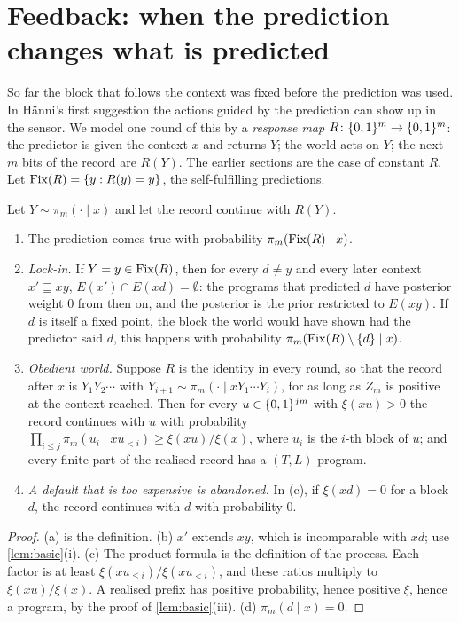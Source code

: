 \section{Feedback: when the prediction changes what is predicted}\label{sec:feedback}

So far the block that follows the context was fixed before the prediction was used. In H\"anni's first
suggestion the actions guided by the prediction can show up in the sensor. We model one round of this by a
\emph{response map} $R\colon\{0,1\}^m\to\{0,1\}^m$: the predictor is given the context $x$ and returns $Y$; the world
acts on $Y$; the next $m$ bits of the record are $R(Y)$. The earlier sections are the case of constant $R$.
Let $\mathrm{Fix}(R)=\{y:R(y)=y\}$, the self-fulfilling predictions.

\begin{theorem}\label{thm:feedback}
Let $Y\sim\pi_m(\cdot\mid x)$ and let the record continue with $R(Y)$.
\begin{enumerate}[label=(\alph*),leftmargin=2em,itemsep=2pt,topsep=2pt]
\item The prediction comes true with probability $\pi_m(\mathrm{Fix}(R)\mid x)$.
\item \emph{Lock-in.} If $Y=y\in\mathrm{Fix}(R)$, then for every $d\ne y$ and every later context $x'\sqsupseteq xy$,
$E(x')\cap E(xd)=\emptyset$: the programs that predicted $d$ have posterior weight $0$ from then on, and the
posterior is the prior restricted to $E(xy)$. If $d$ is itself a fixed point, the block the world would have
shown had the predictor said $d$, this happens with probability $\pi_m(\mathrm{Fix}(R)\setminus\{d\}\mid x)$.
\item \emph{Obedient world.} Suppose $R$ is the identity in every round, so that the record after $x$ is
$Y_1Y_2\cdots$ with $Y_{i+1}\sim\pi_m(\cdot\mid xY_1\cdots Y_i)$, for as long as $Z_m$ is positive at the
context reached. Then for every $u\in\{0,1\}^{jm}$ with $\xi(xu)>0$ the record
continues with $u$ with probability $\prod_{i\le j}\pi_m(u_i\mid xu_{<i})\ge\xi(xu)/\xi(x)$, where $u_i$ is the
$i$-th block of $u$; and every finite part of the realised record has a $(T,L)$-program.
\item \emph{A default that is too expensive is abandoned.} In (c), if $\xi(xd)=0$ for a block $d$, the record
continues with $d$ with probability $0$.
\end{enumerate}
\end{theorem}
\begin{proof}
(a) is the definition. (b) $x'$ extends $xy$, which is incomparable with $xd$; use \cref{lem:basic}(i). (c) The
product formula is the definition of the process. Each factor is at least $\xi(xu_{\le i})/\xi(xu_{<i})$, and
these ratios multiply to $\xi(xu)/\xi(x)$. A realised prefix has positive probability, hence positive $\xi$,
hence a program, by the proof of \cref{lem:basic}(iii). (d) $\pi_m(d\mid x)=0$.
\end{proof}

